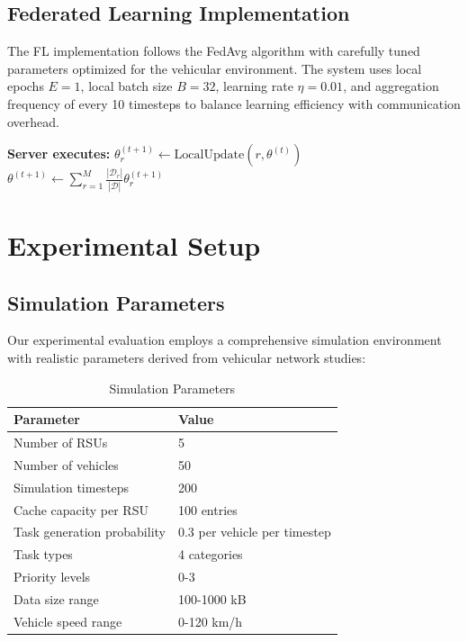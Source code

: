 \documentclass[11pt]{article}
\begin{document}
\subsection{Federated Learning Implementation}

The FL implementation follows the FedAvg algorithm with carefully tuned parameters optimized for the vehicular environment. The system uses local epochs $E = 1$, local batch size $B = 32$, learning rate $\eta = 0.01$, and aggregation frequency of every 10 timesteps to balance learning efficiency with communication overhead.

\begin{algorithm}
\caption{Federated Learning Round}
\begin{algorithmic}[1]
\STATE \textbf{Server executes:}
        \STATE $\theta_r^{(t+1)} \leftarrow \text{LocalUpdate}(r, \theta^{(t)})$
    \ENDFOR
    \STATE $\theta^{(t+1)} \leftarrow \sum_{r=1}^{M} \frac{|\mathcal{D}_r|}{|\mathcal{D}|} \theta_r^{(t+1)}$
\ENDFOR
\end{algorithmic}
\end{algorithm}

\section{Experimental Setup}

\subsection{Simulation Parameters}

Our experimental evaluation employs a comprehensive simulation environment with realistic parameters derived from vehicular network studies:

\begin{table}[h]
\centering
\begin{tabular}{@{}ll@{}}
\toprule
Parameter & Value \\
\midrule
Number of RSUs & 5 \\
Number of vehicles & 50 \\
Simulation timesteps & 200 \\
Cache capacity per RSU & 100 entries \\
Task generation probability & 0.3 per vehicle per timestep \\
Task types & 4 categories \\
Priority levels & 0-3 \\
Data size range & 100-1000 kB \\
Vehicle speed range & 0-120 km/h \\
\bottomrule
\end{tabular}
\caption{Simulation Parameters}
\end{table}
\end{document}
